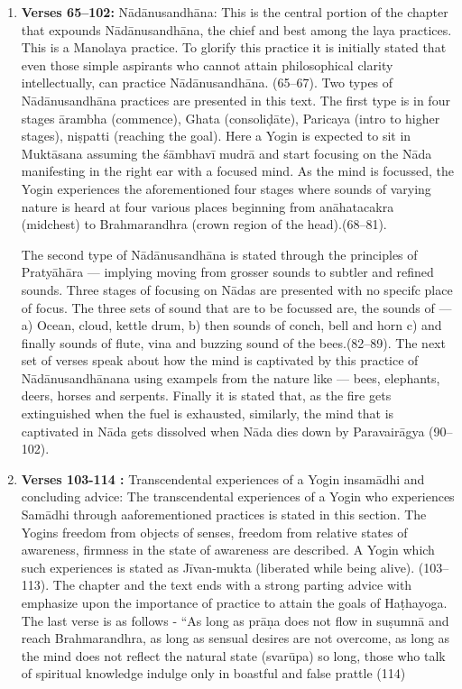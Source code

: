 \begin{enumerate}
\item \textbf{Verses 65--102:} Nādānusandhāna: This is the central portion of the chapter that expounds Nādānusandhāna, the chief and best among the laya practices. This is a Manolaya practice. To glorify this practice it is initially stated that even those simple aspirants who cannot attain philosophical clarity intellectually, can practice Nādānusandhāna. (65--67). Two types of Nādānusandhāna practices are presented in this text. The first type is in four stages ārambha (commence), Ghata (consoliḍāte), Paricaya (intro to higher stages), niṣpatti (reaching the goal). Here a Yogin is expected to sit in Muktāsana assuming the śāmbhavī mudrā and start focusing on the Nāda manifesting in the right ear with a focused mind.  As the mind is focussed, the Yogin experiences the aforementioned four stages where sounds of varying nature is heard at four various places beginning from anāhatacakra (midchest) to Brahmarandhra (crown region of the head).(68--81).

The second type of Nādānusandhāna is stated through the principles of Pratyāhāra --- implying moving from grosser sounds to subtler and refined sounds. Three stages of focusing on Nādas are presented with  no specifc place of focus. The three sets of sound that are to be focussed are, the sounds of --- a) Ocean, cloud, kettle drum, b) then sounds of conch, bell and horn c) and finally sounds of flute, vina and buzzing sound of the bees.(82--89). The next set of verses speak about how the mind is captivated by this practice of Nādānusandhānana using exampels from the nature like --- bees, elephants, deers, horses and serpents. Finally it is stated that, as the fire gets extinguished when the fuel is exhausted, similarly, the mind that is captivated in Nāda gets dissolved when Nāda dies down by Paravairāgya (90--102).
 
\item \textbf{Verses 103-114 :} Transcendental experiences of a Yogin in\break samādhi and concluding advice: The transcendental experiences of a Yogin who experiences Samādhi through aaforementioned practices is stated in this section. The Yogins freedom from objects of senses, freedom from relative states of awareness, firmness in the state of awareness are described. A Yogin which such experiences is stated as Jīvan-mukta (liberated while being alive). (103--113). The chapter and the text ends with a strong parting advice with emphasize upon the importance of practice to attain the goals of Haṭhayoga. The last verse is as follows - “As long as prāṇa does not flow in suṣumnā and reach Brahmarandhra, as long as sensual desires are not overcome, as long as the mind does not reflect the natural state (svarūpa) so long, those who talk of spiritual knowledge indulge only in boastful and false prattle (114)   
\end{enumerate}
